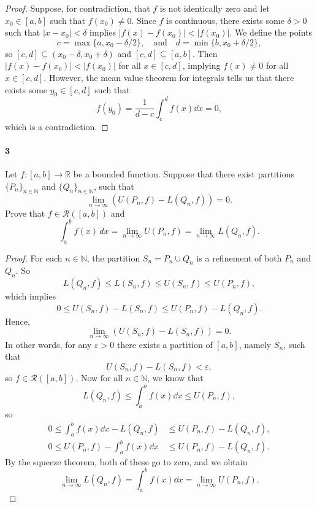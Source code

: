 \documentclass[12pt]{article}
\newenvironment{fullbox}{\begin{lrbox}{\savefullbox}\begin{minipage}{\dimexpr\textwidth-2\fboxsep\relax}}{\end{minipage}\end{lrbox}\begin{center}\framebox[\textwidth]{\usebox{\savefullbox}}\end{center}}
\newenvironment{pbox}[1][]{\begin{fullbox}\ifx#1\empty\else\paragraph{#1}\fi}{\end{fullbox}}
\theoremstyle{definition}
\newcommand{\isp}[1]{\quad\text{#1}\quad}
\newcommand{\N}{\mathbb{N}}
\newcommand{\R}{\mathbb{R}}
\newcommand{\eps}{\varepsilon}
\newcommand{\RR}{\mathcal{R}}
\begin{document}
\begin{proof}
    Suppose, for contradiction, that $f$ is not identically zero and let $x_0 \in [a,b]$ such that $f(x_0) \ne 0$. Since $f$ is continuous, there exists some $\delta > 0$ such that $|x - x_0| < \delta$ implies $|f(x) - f(x_0)| < |f(x_0)|$. We define the points
    \[
        c = \max\{a, x_0 - \delta/2\},
        \isp{and}
        d = \min\{b, x_0 + \delta/2\},
    \]
    so $[c,d] \subseteq (x_0-\delta, x_0+\delta)$ and $[c,d] \subseteq [a,b]$. Then $|f(x) - f(x_0)| < |f(x_0)|$ for all $x \in [c, d]$, implying $f(x) \ne 0$ for all $x \in [c,d]$. However, the mean value theorem for integrals tells us that there exists some $y_0 \in [c, d]$ such that
    \[
        f(y_0) = \frac{1}{d-c}\int_{c}^{d} f(x) \dd{x} = 0,
    \]
    which is a contradiction.
    
\end{proof}





\newpage
\begin{pbox}[3]
    Let $f:[a,b]\to \R$ be a bounded function. Suppose that there exist partitions $\{P_n\}_{n\in\N}$ and $\{Q_n\}_{n\in \N}$, such that 
    \begin{equation}
    \lim_{n\to \infty} (U(P_n,f)-L(Q_n,f))=0. 
    \end{equation}
    Prove that $f\in \mathcal{R}([a,b])$ and 
    \begin{equation}
    \int_a^b f(x)\,dx = \lim_{n\to \infty} U(P_n,f)= \lim_{n\to \infty} L(Q_n,f).
    \end{equation}
\end{pbox}

\begin{proof}
    For each $n \in \N$, the partition $S_n = P_n \cup Q_n$ is a refinement of both $P_n$ and $Q_n$. So
    \[
        L(Q_n, f) \leq L(S_n, f) \leq U(S_n, f) \leq U(P_n, f),
    \]
    which implies
    \[
        0 \leq U(S_n, f) - L(S_n, f) \leq U(P_n, f) - L(Q_n, f).
    \]
    Hence,
    \[
        \lim_{n \to \infty} (U(S_n, f) - L(S_n, f)) = 0.
    \]
    In other words, for any $\eps > 0$ there exists a partition of $[a,b]$, namely $S_n$, such that
    \[
        U(S_n, f) - L(S_n, f) < \eps,
    \]
    so $f \in \RR([a,b])$. Now for all $n \in \N$, we know that
    \[
        L(Q_n, f) \leq \int_{a}^{b} f(x) \dd{x} \leq U(P_n, f),
    \]
    so
    \begin{align*}
        0 \leq \int_{a}^{b} f(x) \dd{x} - L(Q_n, f) &\leq U(P_n,f) - L(Q_n,f), \\
        0 \leq U(P_n, f) - \int_{a}^{b} f(x) \dd{x} &\leq U(P_n,f) - L(Q_n,f).
    \end{align*}
    By the squeeze theorem, both of these go to zero, and we obtain
    \[
        \lim_{n\to\infty} L(Q_n, f) = \int_{a}^{b} f(x) \dd{x} = \lim_{n\to\infty} U(P_n, f).
    \]
    
    
\end{proof}
\end{document}
